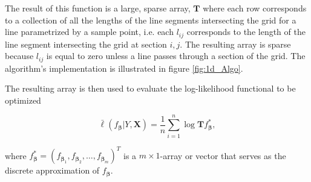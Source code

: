 \documentclass[a4paper,12pt]{article}
\newcommand{\bbeta}{{\boldsymbol{\beta}}}
\newcommand{\bX}{\mathbf{X}}
\begin{document}
\medskip

The result of this function is a large, sparse array, $\mathbf{T}$ where each row corresponds to a collection of all the lengths of the line segments intersecting the grid for a line parametrized by a sample point, i.e. each $l_{ij}$ corresponds to the length of the line segment intersecting the grid at section $i,j$. The resulting array is sparse because $l_{ij}$ is equal to zero unless a line passes through a section of the grid. The algorithm's implementation is illustrated in figure \ref{fig:1d_Algo}. 

The resulting array is then used to evaluate the log-likelihood functional to be optimized

\begin{equation}
\bar{\ell}(f_\bbeta|Y,\bX)= \frac{1}{n}\sum_{i=1}^{n}\log\textbf{T} f_\bbeta^{*},
\label{eqn:discrete_loglikelihood}
\end{equation}

where $f_\bbeta^{*} = (f_{\bbeta_{1}}, f_{\bbeta_{2}}, \hdots, f_{\bbeta_{m}})^T$ is a $m \times 1$-array or vector that serves as the discrete approximation of $f_\bbeta$.
\end{document}
